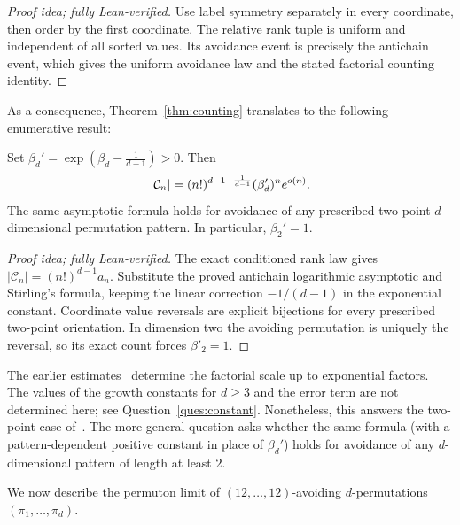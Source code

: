 \documentclass[11pt,letterpaper]{article}
\begin{document}
\begin{proof}[Proof idea; fully Lean-verified]
Use label symmetry separately in every coordinate, then order by the first coordinate. The relative rank tuple is uniform and independent of all sorted values. Its avoidance event is precisely the antichain event, which gives the uniform avoidance law and the stated factorial counting identity.
\end{proof}
As a consequence, Theorem~\ref{thm:counting} translates to the following enumerative result:

\begin{proposition}\label{prop:counting}\label{cor:counting}
      Set $\beta_d'=\exp\!\left(\beta_d-\frac1{d-1}\right)>0$. Then
      \[
            |\mathcal C_n|=(n!)^{d-1-\frac1{d-1}}(\beta_d')^n e^{o(n)}.
      \]
      The same asymptotic formula holds for avoidance of any prescribed two-point $d$-dimensional permutation pattern. In particular, $\beta_2'=1$.
\end{proposition}

\begin{proof}[Proof idea; fully Lean-verified]
The exact conditioned rank law gives $|\mathcal C_n|=(n!)^{d-1}a_n$. Substitute the proved antichain logarithmic asymptotic and Stirling's formula, keeping the linear correction $-1/(d-1)$ in the exponential constant. Coordinate value reversals are explicit bijections for every prescribed two-point orientation. In dimension two the avoiding permutation is uniquely the reversal, so its exact count forces $\beta'_2=1$.
\end{proof}
The earlier estimates~\cite{CK,GP} determine the factorial scale up to exponential factors. The values of the growth constants for $d\ge3$ and the error term are not determined here; see Question~\ref{ques:constant}. Nonetheless, this answers the two-point case of~\cite[Question~9.3]{CK}. The more general question asks whether the same formula (with a pattern-dependent positive constant in place of $\beta_d'$) holds for avoidance of any $d$-dimensional pattern of length at least $2$.

We now describe the permuton limit of $(12,\ldots,12)$-avoiding $d$-permutations $(\pi_1,\ldots,\pi_d)$.
\end{document}
